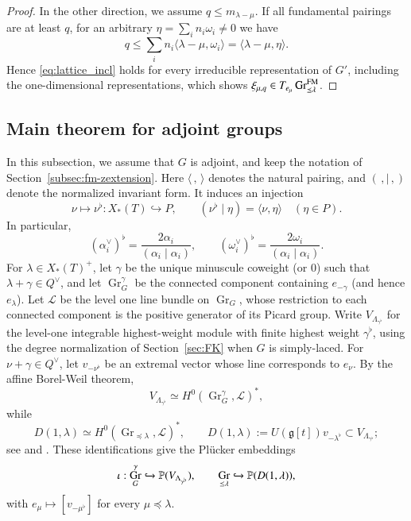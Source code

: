 \documentclass[a4paper, 12pt]{amsart}
\theoremstyle{definition}
\newcommand{\g}{\mathfrak g}
\DeclareMathOperator{\Gr}{\mathrm{Gr}}
\begin{document}
\begin{proof}
In the other direction, we assume $q \leq m_{\lambda-\mu}$. If all fundamental pairings are at least $q$, for an arbitrary
$\eta=\sum_i n_i\omega_i\neq0$ we have
\[q \leq \sum_i n_i \langle \lambda-\mu, \omega_i \rangle = \langle \lambda - \mu, \eta\rangle.\]
Hence \eqref{eq:lattice_incl} holds for every irreducible representation
of $G'$, including the one-dimensional representations, which shows $\xi_{\mu,q} \in T_{e_{\mu}} \Gr_{\preceq \lambda}^{\rm{FM}}$. 
\end{proof}

\subsection{Main theorem for adjoint groups}
\label{subsec:main-adjoint}

In this subsection, we assume that $G$ is adjoint, and
keep the notation of Section~\ref{subsec:fm-zextension}. Here
$\langle\, ,\,\rangle$ denotes the natural pairing, and
 $(\,,\mid\,,)$ denote the normalized invariant form. It induces an injection
\[
\nu\longmapsto\nu^\flat:X_*(T)\hookrightarrow P,
\qquad (\nu^\flat\mid\eta)=\langle\nu,\eta\rangle\quad(\eta\in P).
\]
In particular,
\[
(\alpha_i^\vee)^\flat=\frac{2\alpha_i}{(\alpha_i\mid\alpha_i)},
\qquad
(\omega_i^\vee)^\flat=\frac{2\omega_i}{(\alpha_i\mid\alpha_i)}.
\]
For $\lambda\in X_*(T)^+$, let $\gamma$ be the unique minuscule coweight (or $0$)
such that $\lambda+\gamma\in Q^\vee$, and let $\Gr_G^\gamma$ be the connected
component containing $e_{-\gamma}$ (and hence $e_\lambda$). Let
$\mathscr L$ be the level one line bundle on $\Gr_G$, whose restriction to each connected component is the positive generator of its Picard group. Write
$V_{\Lambda_{\gamma^\flat}}$ for the level-one integrable highest-weight
module with finite highest weight $\gamma^\flat$, using the degree
normalization of Section~\ref{sec:FK} when $G$ is simply-laced.
For $\nu+\gamma\in Q^\vee$, let $v_{-\nu^\flat}$ be an extremal vector whose line corresponds to $e_\nu$.
By the affine Borel-Weil theorem,
\begin{equation}\label{eq:pluck}
V_{\Lambda_{\gamma^\flat}}\simeq H^0(\Gr_G^\gamma,\mathscr L)^*,
\end{equation}
while
\[
D(1,\lambda)\simeq H^0(\Gr_{\preceq\lambda},\mathscr L)^*,
\qquad
D(1,\lambda):=U(\g[t])v_{-\lambda^\flat}\subset V_{\Lambda_{\gamma^\flat}};
\]
see \cite[Proposition~1.4.4]{Zhu09} and \cite{Ku}. These identifications
give the Pl\"ucker embeddings
\begin{equation}\label{eq:pluck_embed}
\iota:\Gr_G^\gamma\xhookrightarrow{}\mathbb P(V_{\Lambda_{\gamma^\flat}}),
\qquad
\Gr_{\preceq\lambda}\xhookrightarrow{}\mathbb P(D(1,\lambda)),
\end{equation}
with $e_\mu\mapsto[v_{-\mu^\flat}]$ for every $\mu\preceq\lambda$.
\end{document}
